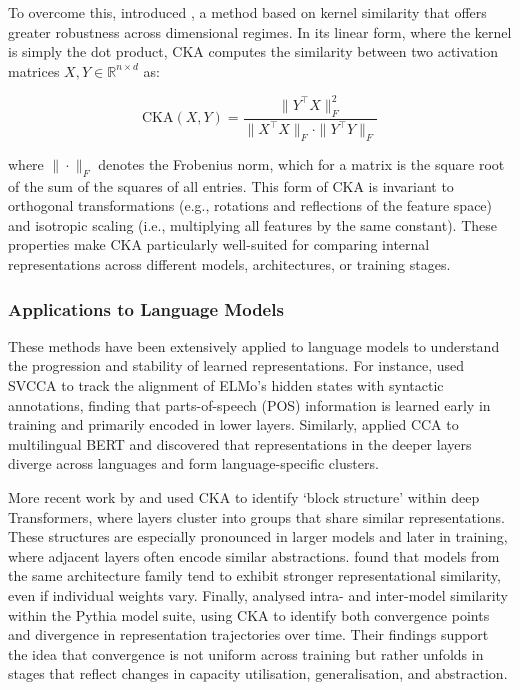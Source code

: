 To overcome this, \citet{kornblith2019cka} introduced , a method based on kernel similarity that offers greater robustness across dimensional regimes. In its linear form, where the kernel is simply the dot product, CKA computes the similarity between two activation matrices \( X, Y \in \mathbb{R}^{n \times d} \) as:

\[
\mathrm{CKA}(X, Y) = \frac{\| Y^\top X \|_F^2}{\| X^\top X \|_F \cdot \| Y^\top Y \|_F}
\]

where \( \|\cdot\|_F \) denotes the Frobenius norm, which for a matrix is the square root of the sum of the squares of all entries. This form of CKA is invariant to orthogonal transformations (e.g., rotations and reflections of the feature space) and isotropic scaling (i.e., multiplying all features by the same constant). These properties make CKA particularly well-suited for comparing internal representations across different models, architectures, or training stages.
 
\subsubsection{Applications to Language Models}

These methods have been extensively applied to language models to understand the progression and stability of learned representations. For instance, \citet{saphra2019understanding} used SVCCA to track the alignment of ELMo's hidden states with syntactic annotations, finding that parts-of-speech (POS) information is learned early in training and primarily encoded in lower layers. Similarly, \citet{singh2019bert} applied CCA to multilingual BERT and discovered that representations in the deeper layers diverge across languages and form language-specific clusters.

More recent work by \citet{nguyen2020wide} and \citet{phang2021finetuned} used CKA to identify `block structure' within deep Transformers, where layers cluster into groups that share similar representations. These structures are especially pronounced in larger models and later in training, where adjacent layers often encode similar abstractions. \citet{wu2020similarity} found that models from the same architecture family tend to exhibit stronger representational similarity, even if individual weights vary. Finally, \citet{brown2023understanding} analysed intra- and inter-model similarity within the Pythia model suite, using CKA to identify both convergence points and divergence in representation trajectories over time. Their findings support the idea that convergence is not uniform across training but rather unfolds in stages that reflect changes in capacity utilisation, generalisation, and abstraction.

